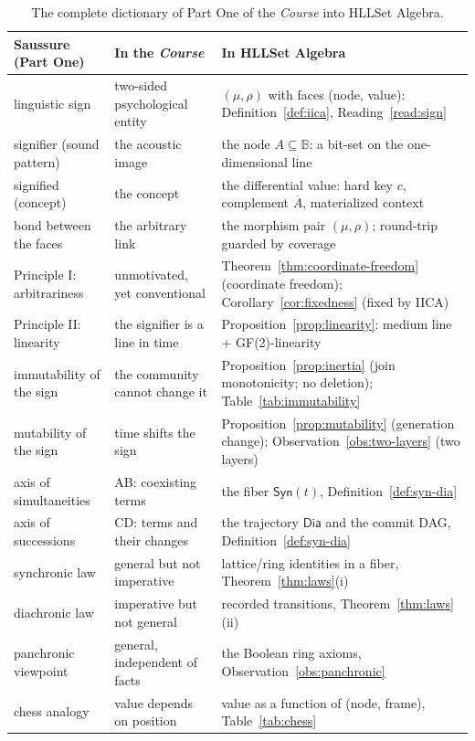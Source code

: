 \documentclass[11pt,a4paper]{article}
\theoremstyle{remark}
\newcommand{\Plane}{\ensuremath{\mathbb{B}}}            %
\newcommand{\Ing}{\ensuremath{\mu}}                      %
\newcommand{\Mat}{\ensuremath{\rho}}                     %
\newcommand{\Sync}{\ensuremath{\mathsf{Syn}}}            %
\newcommand{\Dia}{\ensuremath{\mathsf{Dia}}}             %
\begin{document}
\begin{table}[htbp]
\centering
\renewcommand{\arraystretch}{1.15}
\begin{tabular}{@{}>{\raggedright\arraybackslash}p{3.6cm}
                    >{\raggedright\arraybackslash}p{4.6cm}
                    >{\raggedright\arraybackslash}p{6.8cm}@{}}
\toprule
Saussure (Part One) & In the \textit{Course} & In HLLSet Algebra \\
\midrule
linguistic sign & two-sided psychological entity & $(\Ing,\Mat)$ with faces
(node, value): Definition~\ref{def:iica}, Reading~\ref{read:sign} \\
signifier (sound pattern) & the acoustic image & the node $A \subseteq \Plane$:
a bit-set on the one-dimensional line \\
signified (concept) & the concept & the differential value: hard key $c$,
complement $\overline{A}$, materialized context \\
bond between the faces & the arbitrary link & the morphism pair
$(\Ing,\Mat)$; round-trip guarded by coverage \\
Principle I: arbitrariness & unmotivated, yet conventional & Theorem~\ref{thm:coordinate-freedom}
(coordinate freedom); Corollary~\ref{cor:fixedness} (fixed by IICA) \\
Principle II: linearity & the signifier is a line in time & Proposition~\ref{prop:linearity}:
medium line + GF(2)-linearity \\
immutability of the sign & the community cannot change it & Proposition~\ref{prop:inertia}
(join monotonicity; no deletion); Table~\ref{tab:immutability} \\
mutability of the sign & time shifts the sign & Proposition~\ref{prop:mutability}
(generation change); Observation~\ref{obs:two-layers} (two layers) \\
axis of simultaneities & AB: coexisting terms & the fiber $\Sync(t)$,
Definition~\ref{def:syn-dia} \\
axis of successions & CD: terms and their changes & the trajectory $\Dia$ and
the commit DAG, Definition~\ref{def:syn-dia} \\
synchronic law & general but not imperative & lattice/ring identities in a
fiber, Theorem~\ref{thm:laws}(i) \\
diachronic law & imperative but not general & recorded transitions,
Theorem~\ref{thm:laws}(ii) \\
panchronic viewpoint & general, independent of facts & the Boolean ring axioms,
Observation~\ref{obs:panchronic} \\
chess analogy & value depends on position & value as a function of
(node, frame), Table~\ref{tab:chess} \\
\bottomrule
\end{tabular}
\caption{The complete dictionary of Part One of the \textit{Course} into
HLLSet Algebra.}
\label{tab:dictionary}
\end{table}
\end{document}
